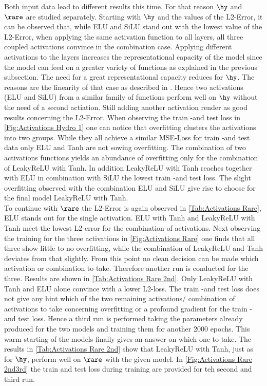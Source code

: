 Both input data lead to different results this time. For that reason $\hy$ and $\rare$ are studied separately. Starting with $\hy$ and the values of the L2-Error, it can be observed that,
while ELU and SiLU stand out with the lowest value of the L2-Error, when applying the same activation function to all layers, all three coupled activations convince in the combination case. Applying different activations to the layers increases the representational capacity of the model since the model can feed on a greater variety of functions as explained in the previous subsection. The need for a great representational capacity reduces for $\hy$. The reasons are the linearity of that case as described in \cite{BGK}. Hence two activations (ELU and SiLU) from a similar family of functions perform well on $\hy$ without the need of a second actiation. Still adding another activation render as good results concerning the L2-Error. When observing the train -and test loss in \cref{Fig:Activations Hydro 1} one can notice that overfitting clusters the activations into two groups. While they all achieve a similar MSE-Loss for train -and test data only ELU and Tanh are not sowing overfitting. The combination of two activations functions yields an abundance of overfitting only for the combination of LeakyReLU with Tanh. In addition LeakyReLU with Tanh reaches together with ELU in combination with SiLU the lowest train -and test loss. The slight overfitting observed with the combination ELU and SiLU  give rise to choose for the final model LeakyReLU with Tanh.\\
To continue with $\rare$  the L2-Error is again observed in \cref{Tab:Activations Rare}, ELU stands out for the single activation. ELU with Tanh and LeakyReLU with Tanh meet the lowest L2-error for the combination of activations. Next observing the training for the three activations in \cref{Fig:Activations Rare} one finds that all three show little to no overfitting, while the combination of LeakyReLU and Tanh deviates from that slightly. From this point no clean decision can be made which activation or combination to take. Therefore another run is conducted for the three. Results are shown in \cref{Tab:Activations Rare 2nd}. Only LeakyReLU with Tanh and ELU alone convince with a lower L2-loss. The train -and test loss does not give any hint which of the two remaining activations/ combination of activations to take concerning overfitting or a profound gradient for the train -and test loss. Hence a third run is performed taking the parameters already produced for the two models and training them for another 2000 epochs. This warm-starting of the models finally gives an answer on which one to take. The results in \cref{Tab:Activations Rare 2nd} show that LeakyReLU with Tanh, just as for $\hy$, perform well on $\rare$ with the given model. In \cref{Fig:Activations Rare 2nd3rd} the train and test loss during training are provided for teh second and third run. 

